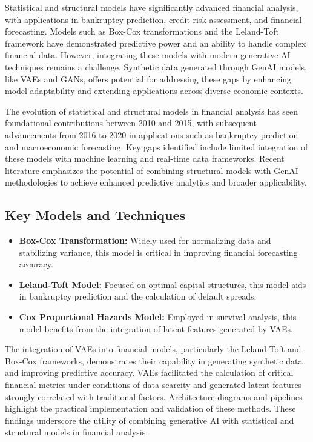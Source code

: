 \documentclass[a4paper,headinclude=on,footinclude=on,12pt,oneside]{scrbook}
\begin{document}
	Statistical and structural models have significantly advanced financial analysis, with applications in bankruptcy prediction, credit-risk assessment, and financial forecasting. Models such as Box-Cox transformations and the Leland-Toft framework have demonstrated predictive power and an ability to handle complex financial data. However, integrating these models with modern generative AI techniques remains a challenge. Synthetic data generated through GenAI models, like VAEs and GANs, offers potential for addressing these gaps by enhancing model adaptability and extending applications across diverse economic contexts.
	
	The evolution of statistical and structural models in financial analysis has seen foundational contributions between 2010 and 2015, with subsequent advancements from 2016 to 2020 in applications such as bankruptcy prediction and macroeconomic forecasting. Key gaps identified include limited integration of these models with machine learning and real-time data frameworks. Recent literature emphasizes the potential of combining structural models with GenAI methodologies to achieve enhanced predictive analytics and broader applicability.
	
	\subsection{Key Models and Techniques}
	\begin{itemize}
		\item \textbf{Box-Cox Transformation:} Widely used for normalizing data and stabilizing variance, this model is critical in improving financial forecasting accuracy.
		\item \textbf{Leland-Toft Model:} Focused on optimal capital structures, this model aids in bankruptcy prediction and the calculation of default spreads.
		\item \textbf{Cox Proportional Hazards Model:} Employed in survival analysis, this model benefits from the integration of latent features generated by VAEs.
	\end{itemize}
	
	The integration of VAEs into financial models, particularly the Leland-Toft and Box-Cox frameworks, demonstrates their capability in generating synthetic data and improving predictive accuracy. VAEs facilitated the calculation of critical financial metrics under conditions of data scarcity and generated latent features strongly correlated with traditional factors. Architecture diagrams and pipelines highlight the practical implementation and validation of these methods. These findings underscore the utility of combining generative AI with statistical and structural models in financial analysis.
	
\end{document}
